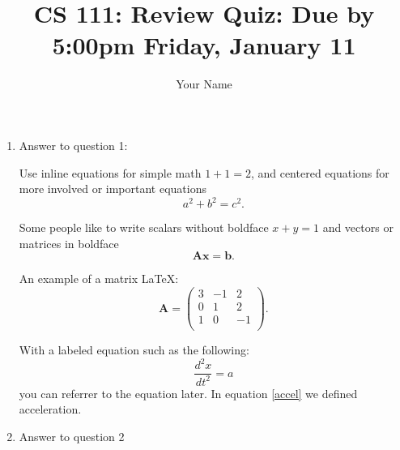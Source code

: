\documentclass[11pt]{article}
\begin{document}
\author{Your Name}
\title{CS 111: Review Quiz: Due by 5:00pm Friday, January 11}
\maketitle

\medskip

\begin{enumerate}

\item
Answer to question 1:

Use inline equations for simple math $1+1=2$, and centered equations for more involved or important equations
\begin{equation}
    a^2 + b^2 = c^2.
\end{equation}

Some people like to write scalars without boldface $x+y=1$ and vectors or matrices in boldface
\begin{equation}
    \mathbf{A} \mathbf{x} = \mathbf{b}.
\end{equation}

An example of a matrix \LaTeX:
\begin{equation}
    \mathbf{A} = \left(
    \begin{array}{ccc}
    3 & -1 & 2 \\ 	
    0 & 1 & 2 \\ 
    1 & 0 & -1 \\
\end{array} 
\right).  
\end{equation}

With a labeled equation such as the following:
\begin{equation}
    \label{accel}
    \frac{d^2 x}{d t^2} = a
\end{equation}
you can referrer to the equation later. In equation \ref{accel} we defined acceleration.


\item
Answer to question 2


\end{enumerate}
\end{document}
